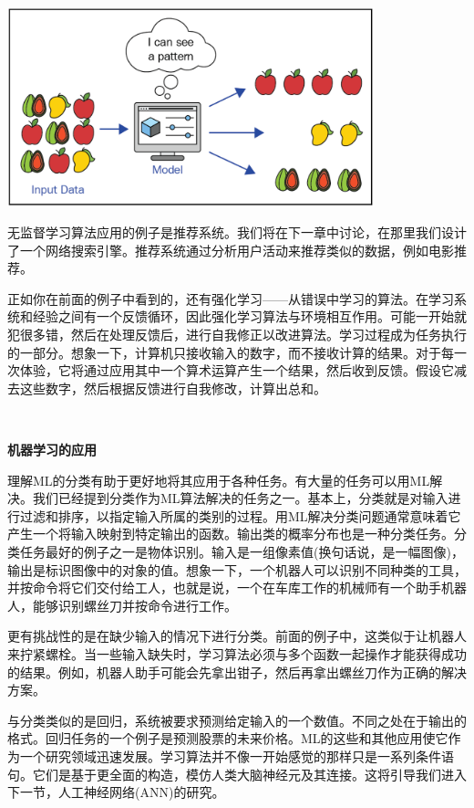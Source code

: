 \begin{center}
	\includegraphics[width=0.8\textwidth]{content/Section-3/Chapter-15/8}
\end{center}

无监督学习算法应用的例子是推荐系统。我们将在下一章中讨论，在那里我们设计了一个网络搜索引擎。推荐系统通过分析用户活动来推荐类似的数据，例如电影推荐。 \par
正如你在前面的例子中看到的，还有强化学习——从错误中学习的算法。在学习系统和经验之间有一个反馈循环，因此强化学习算法与环境相互作用。可能一开始就犯很多错，然后在处理反馈后，进行自我修正以改进算法。学习过程成为任务执行的一部分。想象一下，计算机只接收输入的数字，而不接收计算的结果。对于每一次体验，它将通过应用其中一个算术运算产生一个结果，然后收到反馈。假设它减去这些数字，然后根据反馈进行自我修改，计算出总和。 \par

\noindent\textbf{}\ \par
\textbf{机器学习的应用} \ \par
理解ML的分类有助于更好地将其应用于各种任务。有大量的任务可以用ML解决。我们已经提到分类作为ML算法解决的任务之一。基本上，分类就是对输入进行过滤和排序，以指定输入所属的类别的过程。用ML解决分类问题通常意味着它产生一个将输入映射到特定输出的函数。输出类的概率分布也是一种分类任务。分类任务最好的例子之一是物体识别。输入是一组像素值(换句话说，是一幅图像)，输出是标识图像中的对象的值。想象一下，一个机器人可以识别不同种类的工具，并按命令将它们交付给工人，也就是说，一个在车库工作的机械师有一个助手机器人，能够识别螺丝刀并按命令进行工作。 \par
更有挑战性的是在缺少输入的情况下进行分类。前面的例子中，这类似于让机器人来拧紧螺栓。当一些输入缺失时，学习算法必须与多个函数一起操作才能获得成功的结果。例如，机器人助手可能会先拿出钳子，然后再拿出螺丝刀作为正确的解决方案。 \par
与分类类似的是回归，系统被要求预测给定输入的一个数值。不同之处在于输出的格式。回归任务的一个例子是预测股票的未来价格。ML的这些和其他应用使它作为一个研究领域迅速发展。学习算法并不像一开始感觉的那样只是一系列条件语句。它们是基于更全面的构造，模仿人类大脑神经元及其连接。这将引导我们进入下一节，人工神经网络(ANN)的研究。 \par

